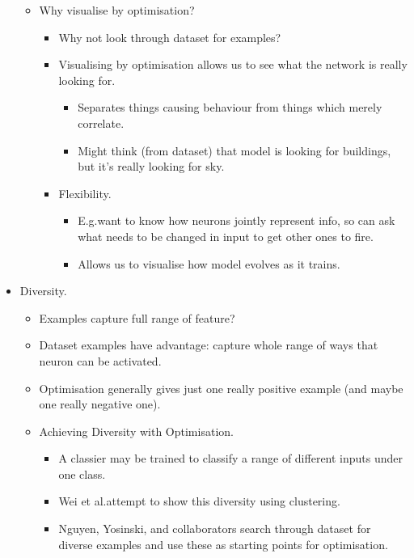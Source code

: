 \begin{itemize}
\begin{itemize}
\begin{itemize}
\begin{itemize}
            \end{itemize}
        \end{itemize}
        \item Why visualise by optimisation?
        \begin{itemize}
            \item Why not look through dataset for examples?
            \item Visualising by optimisation allows us to see what the network is really looking for.
            \begin{itemize}
                \item Separates things causing behaviour from things which merely correlate.
                \item Might think (from dataset) that model is looking for buildings, but it's really looking for sky.
            \end{itemize}
            \item Flexibility.
            \begin{itemize}
                \item E.g.\@ want to know how neurons jointly represent info, so can ask what needs to be changed in input to get other ones to fire.
                \item Allows us to visualise how model evolves as it trains.
            \end{itemize}
        \end{itemize}
    \end{itemize}
    \item Diversity.
    \begin{itemize}
        \item Examples capture full range of feature?
        \item Dataset examples have advantage: capture whole range of ways that neuron can be activated.
        \item Optimisation generally gives just one really positive example (and maybe one really negative one).
        \item Achieving Diversity with Optimisation.
        \begin{itemize}
            \item A classier may be trained to classify a range of different inputs under one class.
            \item Wei et al.\@ attempt to show this diversity using clustering.
            \item Nguyen, Yosinski, and collaborators search through dataset for diverse examples and use these as starting points for optimisation.

\end{itemize}
\end{itemize}
\end{itemize}
